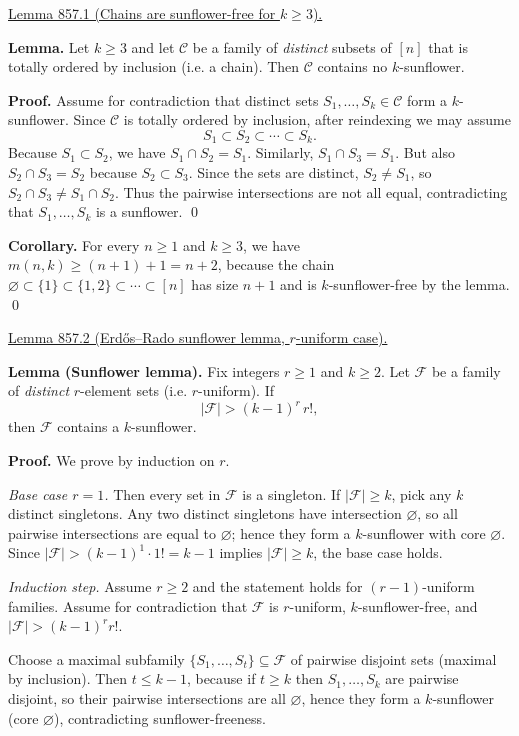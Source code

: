\medskip
\noindent\underline{Lemma 857.1 (Chains are sunflower-free for $k\ge 3$).}

\textbf{Lemma.}
Let $k\ge 3$ and let $\mathcal C$ be a family of \emph{distinct} subsets of $[n]$ that is totally ordered by inclusion (i.e. a chain). Then $\mathcal C$ contains no $k$-sunflower.

\textbf{Proof.}
Assume for contradiction that distinct sets $S_1,\dots,S_k\in\mathcal C$ form a $k$-sunflower. Since $\mathcal C$ is totally ordered by inclusion, after reindexing we may assume
\[
S_1 \subset S_2 \subset \cdots \subset S_k.
\]
Because $S_1\subset S_2$, we have $S_1\cap S_2 = S_1$. Similarly, $S_1\cap S_3=S_1$.
But also $S_2\cap S_3 = S_2$ because $S_2\subset S_3$.
Since the sets are distinct, $S_2\ne S_1$, so $S_2\cap S_3 \ne S_1\cap S_2$.
Thus the pairwise intersections are not all equal, contradicting that $S_1,\dots,S_k$ is a sunflower.
\qed

\textbf{Corollary.}
For every $n\ge 1$ and $k\ge 3$, we have $m(n,k)\ge (n+1)+1 = n+2$, because the chain
$\varnothing \subset \{1\} \subset \{1,2\} \subset \cdots \subset [n]$
has size $n+1$ and is $k$-sunflower-free by the lemma.
\qed

\medskip
\noindent\underline{Lemma 857.2 (Erd\H{o}s--Rado sunflower lemma, $r$-uniform case).}

\textbf{Lemma (Sunflower lemma).}
Fix integers $r\ge 1$ and $k\ge 2$. Let $\mathcal F$ be a family of \emph{distinct} $r$-element sets (i.e. $r$-uniform). If
\[
|\mathcal F| > (k-1)^r\, r! ,
\]
then $\mathcal F$ contains a $k$-sunflower.

\textbf{Proof.}
We prove by induction on $r$.

\emph{Base case $r=1$.} Then every set in $\mathcal F$ is a singleton. If $|\mathcal F|\ge k$, pick any $k$ distinct singletons. Any two distinct singletons have intersection $\varnothing$, so all pairwise intersections are equal to $\varnothing$; hence they form a $k$-sunflower with core $\varnothing$. Since $|\mathcal F|>(k-1)^1\cdot 1!=k-1$ implies $|\mathcal F|\ge k$, the base case holds.

\emph{Induction step.} Assume $r\ge 2$ and the statement holds for $(r-1)$-uniform families.
Assume for contradiction that $\mathcal F$ is $r$-uniform, $k$-sunflower-free, and $|\mathcal F|>(k-1)^r r!$.

Choose a maximal subfamily $\{S_1,\dots,S_t\}\subseteq\mathcal F$ of pairwise disjoint sets (maximal by inclusion). Then $t\le k-1$, because if $t\ge k$ then $S_1,\dots,S_k$ are pairwise disjoint, so their pairwise intersections are all $\varnothing$, hence they form a $k$-sunflower (core $\varnothing$), contradicting sunflower-freeness.

